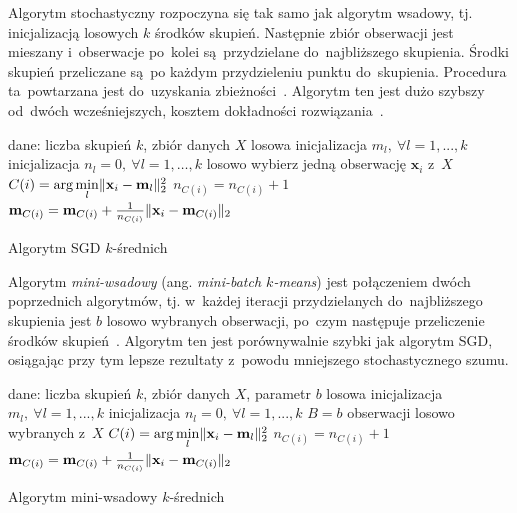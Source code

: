 \documentclass{praca1}
\DeclarePairedDelimiter{\norm}{\lVert}{\rVert}
\begin{document}
Algorytm stochastyczny rozpoczyna się tak samo jak algorytm wsadowy, tj. inicjalizacją losowych $k$ środków skupień. Następnie zbiór obserwacji jest mieszany i~obserwacje po~kolei są~przydzielane do~najbliższego skupienia. Środki skupień przeliczane są~po każdym przydzieleniu punktu do~skupienia. Procedura ta~powtarzana jest do~uzyskania zbieżności~\cite{Bottou1995:convergenceproperties}. Algorytm ten jest dużo szybszy od~dwóch wcześniejszych, kosztem dokładności rozwiązania~\cite{Bottou2012:sgdtricks}.

\begin{algorithm}[h!]
\begin{algorithmic}[1]
		\State dane: liczba skupień $k$, zbiór danych $X$
        \State losowa inicjalizacja $m_l, \ \forall l=1, ..., k$
        \State inicjalizacja $n_l = 0, \ \forall l=1, \ldots, k$
        \Repeat
        	\State losowo wybierz jedną obserwację $\mathbf{x}_i$ z~$X$
                \State $C(i) = \arg \min\limits_{l} \norm{\mathbf{x}_i - \mathbf{m}_l }_2^2 $
                \State $n_{C(i)} = n_{C(i)} + 1$
                \State $\mathbf{m}_{C(i)} = \mathbf{m}_{C(i)} + \frac{1}{n_{C(i)}}\norm{\mathbf{x}_i - \mathbf{m}_{C(i)}}_2$
\end{algorithmic}
\caption{Algorytm SGD $k$-średnich}\label{alg:002}
\end{algorithm}

Algorytm \emph{mini-wsadowy} (ang. \emph{mini-batch $k$-means}) jest połączeniem dwóch poprzednich algorytmów, tj. w~każdej iteracji przydzielanych do~najbliższego skupienia jest $b$ losowo wybranych obserwacji, po~czym następuje przeliczenie środków skupień~\cite{Sculley2010:webkmeans}. Algorytm ten jest porównywalnie szybki jak algorytm SGD, osiągając przy tym lepsze rezultaty z~powodu mniejszego stochastycznego szumu.

\begin{algorithm}[h!]
\begin{algorithmic}[1]
		\State dane: liczba skupień $k$, zbiór danych $X$, parametr $b$
        \State losowa inicjalizacja $m_l, \ \forall l=1, ..., k$
        \State inicjalizacja $n_l = 0, \ \forall l=1, ..., k$
        \Repeat
        	\State $B = b$ obserwacji losowo wybranych z~$X$
                \State $C(i) = \arg \min\limits_{l} \norm{\mathbf{x}_i - \mathbf{m}_l }_2^2 $
            \EndFor
                \State $n_{C(i)} = n_{C(i)} + 1$
                \State $\mathbf{m}_{C(i)} = \mathbf{m}_{C(i)} + \frac{1}{n_{C(i)}}\norm{\mathbf{x}_i - \mathbf{m}_{C(i)}}_2$
            \EndFor
\end{algorithmic}
\caption{Algorytm mini-wsadowy $k$-średnich}\label{alg:003}
\end{algorithm}
\end{document}
